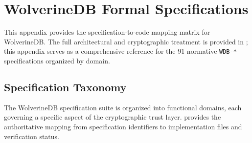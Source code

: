 \chapter{WolverineDB Formal Specifications}
\label{app:wolverinedb-specifications}

This appendix provides the specification-to-code mapping matrix for WolverineDB. The full architectural and cryptographic treatment is provided in ; this appendix serves as a comprehensive reference for the 91 normative \texttt{WDB-*} specifications organized by domain.

\section{Specification Taxonomy}
\label{app-sec:wdb-taxonomy}

The WolverineDB specification suite is organized into functional domains, each governing a specific aspect of the cryptographic trust layer.  provides the authoritative mapping from specification identifiers to implementation files and verification status.

